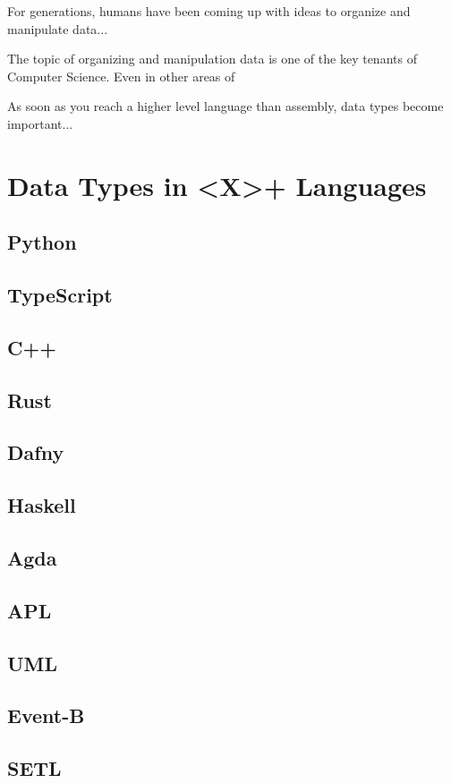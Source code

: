 \documentclass{article}
\begin{document}
For generations, humans have been coming up with ideas to organize and manipulate data...

The topic of organizing and manipulation data is one of the key tenants of Computer Science.
Even in other areas of


As soon as you reach a higher level language than assembly, data types become important...

\section{Data Types in <X>+ Languages} %
\subsection{Python}
\subsection{TypeScript}
\subsection{C++}
\subsection{Rust}
\subsection{Dafny}
\subsection{Haskell}
\subsection{Agda}
\subsection{APL}
\subsection{UML}
\subsection{Event-B}
\subsection{SETL} %
\end{document}
